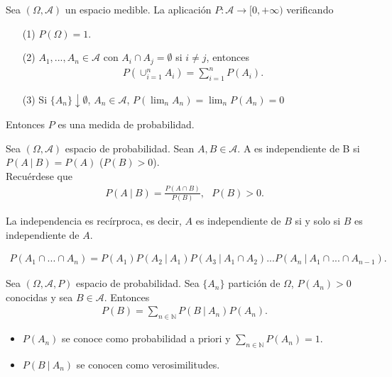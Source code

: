 \begin{teo}
Sea $(\Omega, \mathcal{A})$ un espacio medible. La aplicación $P: \mathcal{A} \longrightarrow [0,+\infty)$ verificando
\begin{enumerate}
    \item[(1)] $P(\Omega) = 1$.
    \item[(2)] $A_1,...,A_n \in \mathcal{A}$ con $A_i \cap A_j = \emptyset$ si $i \not = j$, entonces
    \begin{align*}
        P(\cup_{i=1}^{n}{A_i}) = \sum_{i=1}^{n}{P(A_i)}.
    \end{align*}
    \item[(3)] Si $\{A_n\} \downarrow \emptyset$, $A_n \in \mathcal{A}$, $P(\lim_{n}{A_n}) = \lim_{n}{P(A_n)} = 0$
\end{enumerate}
Entonces $P$ es una medida de probabilidad.
\end{teo}

\begin{defi}
Sea $(\Omega, \mathcal{A})$ espacio de probabilidad. Sean $A, B \in \mathcal{A}$. A es independiente de B si $P(A \ | \ B) = P(A)$ ($P(B) > 0$).
\\
\newline
Recuérdese que
\begin{align*}
    P(A \ | \ B) = \frac{P(A \cap B)}{P(B)}, \ \ \ P(B) > 0.
\end{align*}
\end{defi}

\begin{obs}
La independencia es recírproca, es decir, $A$ es independiente de $B$ si y solo si $B$ es independiente de $A$.
\end{obs}

\begin{teo}
\begin{align*}
    P(A_1 \cap ... \cap A_n) = P(A_1)P(A_2 \ | \ A_1)P(A_3 \ | \ A_1 \cap A_2)...P(A_n \ | \ A_1 \cap ... \cap A_{n-1}).
\end{align*}
\end{teo}

\begin{teo}
Sea $(\Omega, \mathcal{A}, P)$ espacio de probabilidad. Sea $\{A_n\}$ partición de $\Omega$, $P(A_n) > 0$ conocidas y sea $B \in \mathcal{A}$. Entonces
\begin{align*}
    P(B) = \sum_{n \in \mathbb{N}}{P(B \ | \ A_n)P(A_n)}.
\end{align*}
\begin{itemize}
    \item $P(A_n)$ se conoce como probabilidad a priori y $\sum_{n \in \mathbb{N}}{P(A_n)} = 1$.
    \item $P(B \ | \ A_n)$ se conocen como verosimilitudes.
\end{itemize}
\end{teo}

